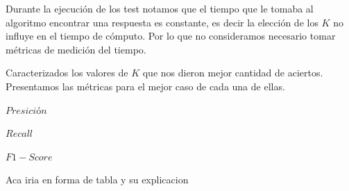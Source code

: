 Durante la ejecución de los test notamos que el tiempo que le tomaba al algoritmo encontrar una respuesta es constante, es decir la elección de los $K$ no influye en el tiempo de cómputo. Por lo que no consideramos necesario tomar métricas de medición del tiempo.

Caracterizados los valores de $K$ que nos dieron mejor cantidad de aciertos. Presentamos las métricas para el mejor caso de cada una de ellas.

$Presición$

$Recall$

$F1-Score$

Aca iria en forma de tabla y su explicacion






